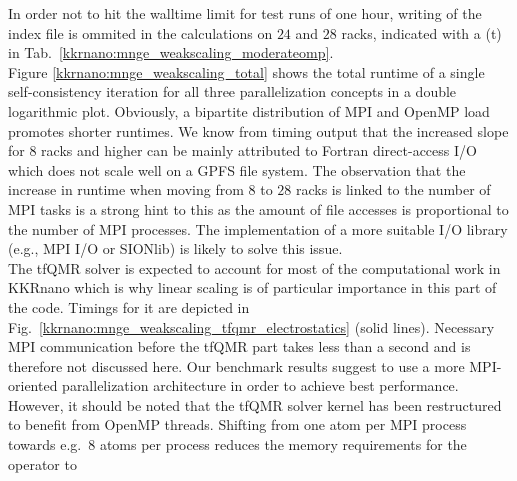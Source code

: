 In order not to hit the walltime limit for test runs of one hour,
writing of the index file is ommited in the calculations on $24$ and $28$ racks, indicated with a (t)
in Tab.~\ref{kkrnano:mnge_weakscaling_moderateomp}.
\\
Figure \ref{kkrnano:mnge_weakscaling_total} shows the total runtime of a single self-consistency iteration 
for all three parallelization concepts in a double logarithmic plot. 
Obviously, a bipartite distribution of MPI and OpenMP load promotes shorter runtimes.
We know from timing output that the increased slope for $8$ racks and higher can be mainly attributed 
to Fortran direct-access I/O which does not scale well on a GPFS file system.
The observation that the increase in runtime when moving from $8$ to $28$ racks
is linked to the number of MPI tasks is a strong hint to this
as the amount of file accesses is proportional to the number of MPI processes.
The implementation of a more suitable I/O library (e.g., MPI I/O or SIONlib) is likely to solve this issue. 
\\
The tfQMR solver is expected to account for most of the computational work in KKRnano
which is why linear scaling is of particular importance in this part of the code. 
Timings for it are depicted in Fig.~\ref{kkrnano:mnge_weakscaling_tfqmr_electrostatics} (solid lines).
Necessary MPI communication before the tfQMR part takes less than a second and is therefore
not discussed here.
Our benchmark results suggest to use a more MPI-oriented parallelization architecture in order to
achieve best performance.
However, it should be noted that the tfQMR solver kernel has been restructured
to benefit from OpenMP threads. Shifting from one atom per MPI process towards
e.g.~$8$ atoms per process reduces the memory requirements for the operator to
